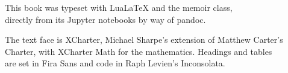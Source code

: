\clearpage
\thispagestyle{empty}
\vspace*{\fill}
\begingroup\centering\fontsize{8.5}{12}\selectfont\color{inkgray}
{\color{accent}\headingfont\small\textasteriskcentered\quad\textasteriskcentered\quad\textasteriskcentered}\par
\vspace{12pt}
This book was typeset with LuaLaTeX and the memoir class,\\
directly from its Jupyter notebooks by way of pandoc.\par
\vspace{6pt}
The text face is XCharter, Michael Sharpe's extension of Matthew Carter's\\
Charter, with XCharter Math for the mathematics. Headings and tables\\
are set in Fira Sans and code in Raph Levien's Inconsolata.\par
\endgroup
\vspace*{1.6in}
